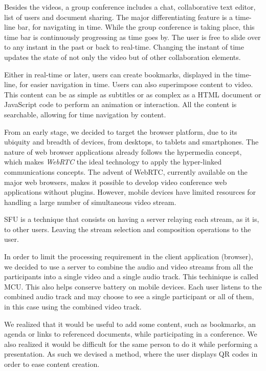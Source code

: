\documentclass[10pt,conference]{IEEEtran}
\begin{document}
Besides the videos, a group conference includes a chat, collaborative text editor, list of users and document sharing.
The major differentiating feature is a time-line bar, for navigating in time.
While the group conference is taking place, this time bar is continuously progressing as time goes by.
The user is free to slide over to any instant in the past or back to real-time.
Changing the instant of time updates the state of not only the video but of other collaboration elements. %

Either in real-time or later, users can create bookmarks, displayed in the time-line, for easier navigation in time.
Users can also superimpose content to video.
This content can be as simple as subtitles or as complex as a \gls{HTML} document or JavaScript code to perform an animation or interaction.
All the content is searchable, allowing for time navigation by content.

From an early stage, we decided to target the browser platform, due to its ubiquity and breadth of devices, from desktops, to tablets and smartphones.
The nature of web browser applications already follows the hypermedia concept, which makes \emph{WebRTC} the ideal technology to apply the hyper-linked communications concepts.
The advent of \gls{WebRTC}, currently available on the major web browsers, makes it possible to develop video conference web applications without plugins.
However, mobile devices have limited resources for handling a large number of simultaneous video stream.

\gls{SFU} is a technique that consists on having a server relaying each stream, as it is, to other users. Leaving the stream selection and composition operations to the user.

In order to limit the processing requirement in the client application (browser), we decided to use a server to combine the audio and video streams from all the participants into a single video and a single audio track. This techinique is called \gls{MCU}.
This also helps conserve battery on mobile devices.
Each user listens to the combined audio track and may choose to see a single participant or all of them, in this case using the combined video track. 

We realized that it would be useful to add some content, such as bookmarks, an agenda or links to referenced documents, while participating in a conference.
We also realized it would be difficult for the same person to do it while performing a presentation.
As such we devised a method, where the user displays \gls{QR} codes in order to ease content creation.
\end{document}
